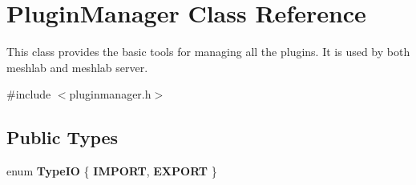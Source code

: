 \hypertarget{class_plugin_manager}{}\section{Plugin\+Manager Class Reference}
\label{class_plugin_manager}


This class provides the basic tools for managing all the plugins. It is used by both meshlab and meshlab server.  




{\ttfamily \#include $<$pluginmanager.\+h$>$}

\subsection*{Public Types}
\begin{DoxyCompactItemize}
\item 
\mbox{\label{class_plugin_manager_aab436cf24ecf95583713358404b0734a}} 
enum {\bfseries Type\+IO} \{ {\bfseries I\+M\+P\+O\+RT}, 
{\bfseries E\+X\+P\+O\+RT}
 \}
\end{DoxyCompactItemize}
